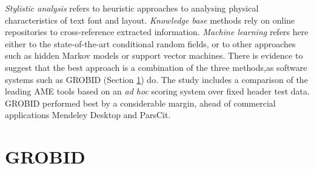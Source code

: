 \emph{Stylistic analysis} refers to heuristic approaches to analysing physical characteristics of text font and layout. \emph{Knowledge base} methods rely on online repositories to cross-reference extracted information. \emph{Machine learning} refers here either to the state-of-the-art conditional random fields, or to other approaches such as hidden Markov models or support vector machines. There is evidence to suggest that the best approach is a combination of the three methods,as software systems such as GROBID (Section \ref{sec:grobid}) do. The study includes a comparison of the leading AME tools based on an \emph{ad hoc} scoring system over fixed header test data. GROBID performed best by a considerable margin, ahead of commercial applications Mendeley Desktop and ParsCit.

\section{GROBID}
\label{sec:grobid}

